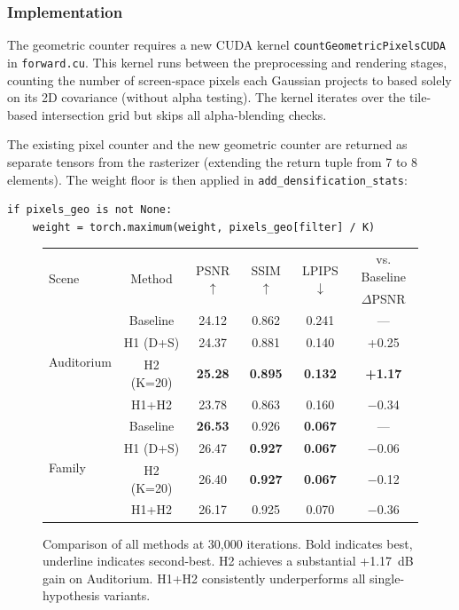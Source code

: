 \documentclass[conference]{IEEEtran}
\begin{document}
\subsubsection{Implementation}

The geometric counter requires a new CUDA kernel \texttt{countGeometricPixelsCUDA} in \texttt{forward.cu}. This kernel runs between the preprocessing and rendering stages, counting the number of screen-space pixels each Gaussian projects to based solely on its 2D covariance (without alpha testing). The kernel iterates over the tile-based intersection grid but skips all alpha-blending checks.

The existing pixel counter and the new geometric counter are returned as separate tensors from the rasterizer (extending the return tuple from 7 to 8 elements). The weight floor is then applied in \texttt{add\_densification\_stats}:

\begin{verbatim}
if pixels_geo is not None:
    weight = torch.maximum(weight, pixels_geo[filter] / K)
\end{verbatim}

\begin{figure}[t]
\centering
\begin{tabular}{lccccc}
\toprule
\multirow{2}{*}{Scene} & \multirow{2}{*}{Method} & \multirow{2}{*}{PSNR$\uparrow$} & \multirow{2}{*}{SSIM$\uparrow$} & \multirow{2}{*}{LPIPS$\downarrow$} & vs. Baseline \\
 & & & & & $\Delta$PSNR \\
\midrule
\multirow{4}{*}{Auditorium} & Baseline & 24.12 & 0.862 & 0.241 & — \\
 & H1 (D+S) & 24.37 & 0.881 & 0.140 & +0.25 \\
 & H2 (K=20) & \textbf{25.28} & \textbf{0.895} & \textbf{0.132} & \textbf{+1.17} \\
 & H1+H2 & 23.78 & 0.863 & 0.160 & $-$0.34 \\
\midrule
\multirow{4}{*}{Family} & Baseline & \textbf{26.53} & 0.926 & \textbf{0.067} & — \\
 & H1 (D+S) & 26.47 & \textbf{0.927} & \textbf{0.067} & $-$0.06 \\
 & H2 (K=20) & 26.40 & \textbf{0.927} & \textbf{0.067} & $-$0.12 \\
 & H1+H2 & 26.17 & 0.925 & 0.070 & $-$0.36 \\
\bottomrule
\end{tabular}
\caption{Comparison of all methods at 30,000 iterations. Bold indicates best, underline indicates second-best. H2 achieves a substantial +1.17~dB gain on Auditorium. H1+H2 consistently underperforms all single-hypothesis variants.}
\label{tab:comparison}
\end{figure}
\end{document}
